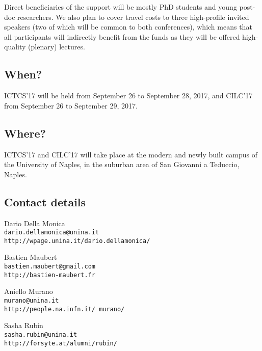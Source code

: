 \documentclass[12pt]{article}
\begin{document}
\begin{spacing}{1}
Direct beneficiaries of the support will be mostly PhD students and young
post-doc researchers.
We also plan to cover travel costs to three high-profile invited speakers (two
of which will be common to both conferences), which means that all participants
will indirectly benefit from the funds as they will be offered high-quality
(plenary) lectures.

\subsection*{When?}

ICTCS'17 will be held from September 26 to September 28, 2017, and
CILC'17 from September 26 to September 29, 2017.

\subsection*{Where?}

ICTCS'17 and CILC'17 will take place at the modern and newly built campus of the
University of Naples, in the suburban area of San Giovanni a Teduccio, Naples.

\subsection*{Contact details}

Dario Della Monica\\
\texttt{\indent dario.dellamonica@unina.it \\ \indent
  http://wpage.unina.it/dario.dellamonica/}

\medskip

\noindent
Bastien Maubert\\
\texttt{\indent bastien.maubert@gmail.com \\ \indent http://bastien-maubert.fr}

\medskip

\noindent
Aniello Murano\\
\texttt{\indent murano@unina.it \\ \indent http://people.na.infn.it/~murano/}

\medskip

\noindent
Sasha Rubin\\
\texttt{\indent sasha.rubin@unina.it \\
\indent http://forsyte.at/alumni/rubin/}

\end{spacing}
\end{document}
